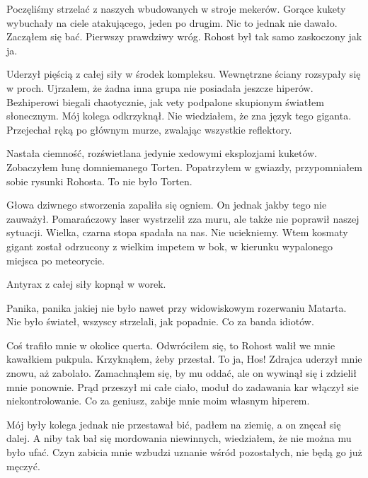 Poczęliśmy strzelać z naszych wbudowanych w stroje mekerów.
Gorące kukety wybuchały na ciele atakującego, jeden po drugim. Nic to jednak nie dawało.
Zacząłem się bać. Pierwszy prawdziwy wróg. Rohost był tak samo zaskoczony jak ja.

\begin{dialogue}
\ds{}  \dm{} Uderzył pięścią z całej siły w środek kompleksu. 
Wewnętrzne ściany rozsypały się w proch. Ujrzałem, że żadna inna grupa nie posiadała jeszcze hiperów. Bezhiperowi biegali chaotycznie, jak vety podpalone skupionym światłem słonecznym.
\ds{}  \dm{} Mój kolega odkrzyknął. Nie wiedziałem, że zna język tego giganta. \dm{} 
\ds{}  \dm{} Przejechał ręką po głównym murze, zwalając wszystkie reflektory. 
\end{dialogue}
Nastała ciemność, rozświetlana jedynie xedowymi eksplozjami kuketów.
Zobaczyłem łunę domniemanego Torten.
Popatrzyłem w gwiazdy, przypomniałem sobie rysunki Rohosta.
To nie było Torten.

Głowa dziwnego stworzenia zapaliła się ogniem.
On jednak jakby tego nie zauważył.
Pomarańczowy laser wystrzelił zza muru, ale także nie poprawił naszej sytuacji.
Wielka, czarna stopa spadała na nas.
Nie uciekniemy.
Wtem kosmaty gigant został odrzucony z wielkim impetem w bok, w kierunku wypalonego miejsca po meteorycie.

\divider{}

Antyrax z całej siły kopnął w worek.

\divider{}

Panika, panika jakiej nie było nawet przy widowiskowym rozerwaniu Matarta.
Nie było świateł, wszyscy strzelali, jak popadnie.
Co za banda idiotów.

Coś trafiło mnie w okolice querta.
Odwróciłem się, to Rohost walił we mnie kawałkiem pukpula.
Krzyknąłem, żeby przestał. To ja, Hos!
Zdrajca uderzył mnie znowu, aż zabolało.
Zamachnąłem się, by mu oddać, ale on wywinął się i zdzielił mnie ponownie.
Prąd przeszył mi całe ciało, moduł do zadawania kar włączył sie niekontrolowanie. 
Co za geniusz, zabije mnie moim własnym hiperem.

Mój były kolega jednak nie przestawał bić, padłem na ziemię, a on znęcał się dalej.
A niby tak bał się mordowania niewinnych, wiedziałem, że nie można mu było ufać.
Czyn zabicia mnie wzbudzi uznanie wśród pozostałych, nie będą go już męczyć.

